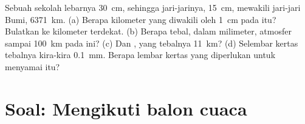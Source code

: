 \begin{exercise}[$\star\star\star$]\label{exo:g8:the-atmosphere:12}
Sebuah  sekolah lebarnya \qty{30}{cm}, sehingga jari-jarinya,
\qty{15}{cm}, mewakili jari-jari Bumi, \qty{6371}{km}. (a) Berapa kilometer
yang diwakili oleh \qty{1}{cm} pada  itu? Bulatkan ke kilometer
terdekat. (b) Berapa tebal, dalam milimeter, atmosfer sampai \qty{100}{km}
pada  ini? (c) Dan , yang tebalnya \qty{11}{km}?
(d) Selembar kertas tebalnya kira-kira \qty{0.1}{mm}. Berapa lembar kertas
yang diperlukan untuk menyamai   itu?
\end{exercise}

\section{Soal: Mengikuti balon cuaca}

